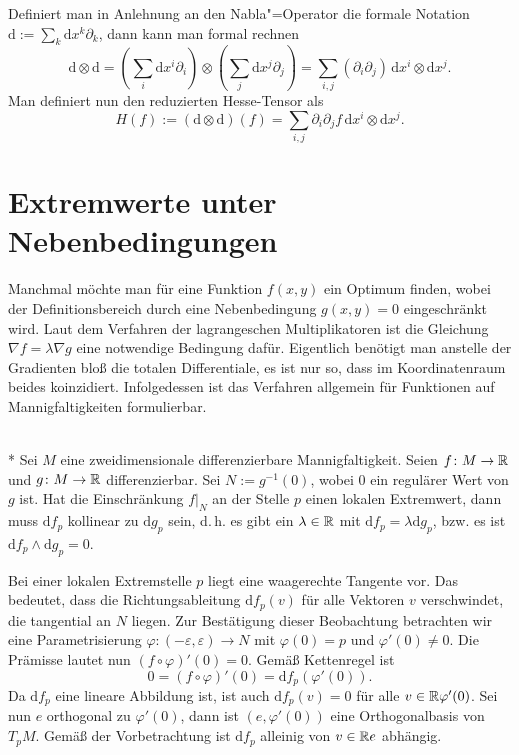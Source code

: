 Definiert man in Anlehnung an den Nabla"=Operator die formale Notation
$\mathrm d := \sum_k\mathrm dx^k\partial_k$,
dann kann man formal rechnen%
\begin{equation}\textstyle
\mathrm d\otimes\mathrm d
= (\sum_i\mathrm dx^i\partial_i)\otimes(\sum_j\mathrm dx^j\partial_j)
= \sum_{i,j} (\partial_i\partial_j)\,\mathrm dx^i\otimes\mathrm dx^j.
\end{equation}
Man definiert nun den reduzierten Hesse-Tensor als%
\begin{equation}\textstyle
H(f) := (\mathrm d\otimes\mathrm d)(f)
= \sum_{i,j} \partial_i\partial_j f\,\mathrm dx^i\otimes\mathrm dx^j.
\end{equation}

\newpage
\section{Extremwerte unter Nebenbedingungen}

Manchmal möchte man für eine Funktion $f(x,y)$ ein Optimum finden,
wobei der Definitionsbereich durch eine
Nebenbedingung $g(x,y)=0$
eingeschränkt wird. Laut dem Verfahren der lagrangeschen
Multiplikatoren
ist die Gleichung $\nabla f = \lambda\nabla g$
eine notwendige Bedingung dafür. Eigentlich benötigt man anstelle
der Gradienten bloß die totalen Differentiale, es ist nur so, dass
im Koordinatenraum beides koinzidiert. Infolgedessen ist das
Verfahren allgemein für Funktionen auf Mannigfaltigkeiten
formulierbar.

\begin{theorem}\mbox{}\\*
Sei $M$ eine zweidimensionale differenzierbare Mannigfaltigkeit.
Seien $f\colon M\to\mathbb R$ und $g\colon M\to\mathbb R$
differenzierbar. Sei $N:=g^{-1}(0)$, wobei 0 ein regulärer Wert 
von $g$ ist. Hat die Einschränkung $f|_N$ an der Stelle $p$ einen
lokalen Extremwert, dann muss $\mathrm df_p$ kollinear zu
$\mathrm dg_p$ sein, d.\,h. es gibt ein $\lambda\in\mathbb R$ mit
$\mathrm df_p = \lambda\mathrm dg_p$, bzw. es ist
$\mathrm df_p\land\mathrm dg_p=0$.
\end{theorem}
\noindent{}
Bei einer lokalen Extremstelle $p$ liegt eine waagerechte Tangente vor.
Das bedeutet, dass die Richtungsableitung $\mathrm df_p(v)$ für alle
Vektoren $v$ verschwindet, die tangential an $N$ liegen. Zur
Bestätigung dieser Beobachtung betrachten wir eine Parametrisierung
$\varphi\colon (-\varepsilon,\varepsilon) \to N$ mit
$\varphi(0)=p$ und $\varphi'(0)\ne 0$. Die Prämisse lautet nun
$(f\circ\varphi)'(0)=0$. Gemäß Kettenregel ist
\begin{equation}
0 = (f\circ\varphi)'(0) =  \mathrm df_p(\varphi'(0)).
\end{equation}
Da $\mathrm df_p$ eine lineare Abbildung ist, ist
auch $\mathrm df_p(v)=0$ für alle $v\in\mathbb R\varphi'(0)$.
Sei nun $e$ orthogonal zu $\varphi'(0)$, dann ist
$(e,\varphi'(0))$ eine Orthogonalbasis von $T_p M$. Gemäß der
Vorbetrachtung ist $\mathrm df_p$ alleinig von $v\in\mathbb R e$ abhängig.

